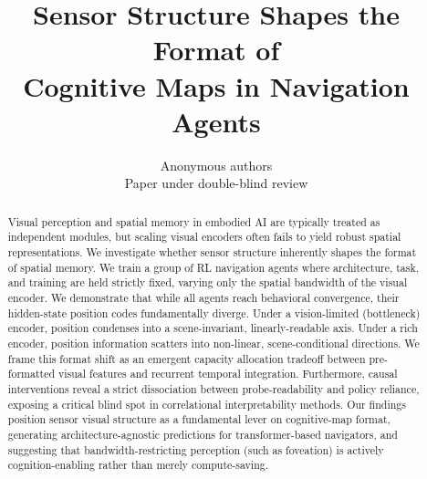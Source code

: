 \documentclass{article}
\title{Sensor Structure Shapes the Format of \\ Cognitive Maps in Navigation Agents}
\author{%
  Anonymous authors\\
  Paper under double-blind review\\
}
\begin{document}
\maketitle

\begin{abstract}
Visual perception and spatial memory in embodied AI are typically treated as independent modules, but scaling visual encoders often fails to yield robust spatial representations. We investigate whether sensor structure inherently shapes the format of spatial memory. We train a group of RL navigation agents where architecture, task, and training are held strictly fixed, varying only the spatial bandwidth of the visual encoder. We demonstrate that while all agents reach behavioral convergence, their hidden-state position codes fundamentally diverge. Under a vision-limited (bottleneck) encoder, position condenses into a scene-invariant, linearly-readable axis. Under a rich encoder, position information scatters into non-linear, scene-conditional directions. We frame this format shift as an emergent capacity allocation tradeoff between pre-formatted visual features and recurrent temporal integration. Furthermore, causal interventions reveal a strict dissociation between probe-readability and policy reliance, exposing a critical blind spot in correlational interpretability methods. Our findings position sensor visual structure as a fundamental lever on cognitive-map format, generating architecture-agnostic predictions for transformer-based navigators, and suggesting that bandwidth-restricting perception (such as foveation) is actively cognition-enabling rather than merely compute-saving.

\end{abstract}
\end{document}
